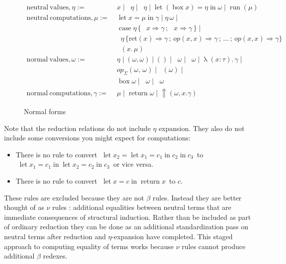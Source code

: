 \documentclass[acmsmall, screen, nonacm]{acmart}
\theoremstyle{definition}
\newcommand{\reflectname}{\Uparrow}
\newcommand{\performraw}[2]{\mathop{\reflectname(#1(#2))}}
\newcommand{\perform}[5]{\performraw{#1}{#2}(#3, #4. #5)}
\newcommand{\reifyname}{\Downarrow}
\newcommand{\reifyraw}[1]{\mathop{\reifyname_{#1}}}
\newcommand{\reify}[3]{\reifyraw{#1}(#2.\,#3)}
\newcommand{\outlname}{\mathrm{out}_L}
\newcommand{\outl}[1]{\mathop{\outlname} #1}
\newcommand{\outrname}{\mathrm{out}_R}
\newcommand{\outr}[1]{\mathop{\outrname} #1}
\newcommand{\indintro}[4]{#2_{#1}(#3,\, #4)}
\newcommand{\retname}{\mathrm{ret}}
\newcommand{\ret}[2]{\mathop{\retname_{#1}}(#2)}
\newcommand{\indelim}[3]{\mathop{\mathrm{rec}_{#1}} #2 \,\{#3\}}
\newcommand{\indretcase}[2]{\retname(#1) \Rightarrow #2}
\newcommand{\indcase}[4]{#1(#2, #3) \Rightarrow #4}
\newcommand{\seq}{\,;\,}
\newcommand{\fst}{\mathop{\pi_1}}
\newcommand{\snd}{\mathop{\pi_2}}
\newcommand{\inl}[1]{\mathop{\mathrm{in}_L} #1}
\newcommand{\inr}[1]{\mathop{\mathrm{in}_R} #1}
\newcommand{\case}[5]{\mathop{\mathrm{case}} #1 \,\{\,\inl{#2} \Rightarrow #3 \seq \inr{#4} \Rightarrow #5 \,\}}
\newcommand{\abs}[3]{\mathop{\lambda}(#1 \types #2).\,#3}
\newcommand{\app}[2]{#1\,#2}
\newcommand{\types}{\mathrel{:}}
\newcommand{\return}[1]{\mathop{\mathrm{return}} #1}
\newcommand{\letv}[3]{\mathop{\mathrm{let}} #1 = #2 \mathop{\mathrm{in}} #3}
\newcommand{\gbox}[1]{\mathop{\mathrm{box}} #1}
\newcommand{\gunbox}[3]{\mathop{\mathrm{let}} (\gbox #1) = #2 \mathop{\mathrm{in}} #3}
\newcommand{\grun}[1]{\mathop{\mathrm{run}}(#1)}
\begin{document}
\begin{figure}
\begin{align*}
  \mathrm{neutral\ values}, \eta :=\;& x \mid \fst \eta \mid \snd \eta
                                     \mid \gunbox{x}{\eta}{\omega} \mid \grun{\mu} \\
  \mathrm{neutral\ computations}, \mu :=\;& \letv{x}{\mu}{\gamma}
                                           \mid \app{\eta}{\omega} \mid \\
                                   & \case{\eta}{x}{\gamma}{x}{\gamma} \mid \\
                            & \indelim{\Sigma}{\eta}
                              {\indretcase{x}{\gamma} \seq
                               \indcase{op}{x}{x}{\gamma} \seq \ldots \seq
                               \indcase{op}{x}{x}{\gamma}} \\
                                   & \reify{\Sigma}{x}{\mu} \\
  \mathrm{normal\ values}, \omega :=\;& \eta \mid (\omega, \omega)
                           \mid () \mid \inl{\omega} \mid \inr{\omega} \mid \abs{x}{\tau}{\gamma} \mid \\
                           &\indintro{\Sigma}{op}{\omega}{\omega} \mid \ret{\Sigma}{\omega} \mid \\
                           &\gbox{\omega} \mid \outl{\omega} \mid \outr{\omega} \\
  \mathrm{normal\ computations}, \gamma :=\;& \mu \mid \return{\omega}
                                               \mid \perform{\eta}{op}{\omega}{x}{\gamma}
\end{align*}
\caption{Normal forms}
\label{fig:normal}
\end{figure}

Note that the reduction relations do not include $\eta$ expansion. They
also do not include some conversions you might expect for computations:
\begin{itemize}
\item There is no rule to convert
  $\; \letv{x_2}{\letv{x_1}{c_1}{c_2}}{c_3} \,$ to
  $\; \letv{x_1}{c_1}{\letv{x_2}{c_2}{c_3}} \,$ or vice versa.
\item There is no rule to convert $\; \letv{x}{c}{\return x} \,$ to $c$.
\end{itemize}
These rules are excluded because they are not $\beta$ rules. Instead
they are better thought of as $\nu$ rules \cite{??}: additional
equalities between neutral terms that are immediate consequences of
structural induction. Rather than be included as part of ordinary
reduction they can be done as an additional standardization pass on
neutral terms after reduction and $\eta$-expansion have completed. This
staged approach to computing equality of terms works because $\nu$ rules
cannot produce additional $\beta$ redexes.
\end{document}
